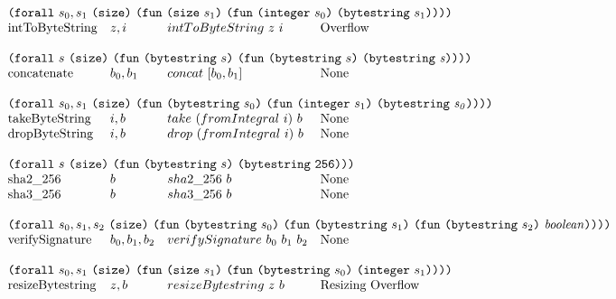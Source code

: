 \documentclass[../main.tex]{subfiles}
\begin{document}
\begin{figure*}[t]
\[\begin{array}{llll}
        \multicolumn{4}{l}{\forallT{s_0,s_1}{\sizeK{}}{\funT{\sizeT{s_1}}{\funT{\integerT{s_0}}{\bytestringT{s_1}}}}}\\
        \mathrm{intToByteString}            &  z, i           &   intToByteString ~ z ~ i   &   \textrm{Overflow} \\
        &&\\
        
        
        \multicolumn{4}{l}{\forallT{s}{\sizeK{}}{\funT{\bytestringT{s}}{\funT{\bytestringT{s}}{\mathit{\bytestringT{s}}}}}}\\
        \mathrm{concatenate}       &   b_0 , b_1   & concat ~ [b_0,b_1]   &   \textrm{None}         \\
        &&\\
        
        \multicolumn{4}{l}{\forallT{s_0,s_1}{\sizeK{}}{\funT{\bytestringT{s_0}}{\funT{\integerT{s_1}}{\mathit{\bytestringT{s_0}}}}}}\\
        \mathrm{takeByteString}    &   i, b     & take ~ (fromIntegral ~ i) ~ b   &   \textrm{None} \\
        \mathrm{dropByteString}    &   i, b     & drop ~ (fromIntegral ~ i) ~ b   &   \textrm{None} \\
        &&\\
        
        \multicolumn{4}{l}{\forallT{s}{\sizeK{}}{\funT{\bytestringT{s}}{\mathit{\bytestringT{\size{256}}}}}}\\
        \mathrm{sha2\_256}         &   b           & sha2\_256 ~ b    & \textrm{None}                \\
        \mathrm{sha3\_256}         &   b           & sha3\_256~ b     & \textrm{None}                \\
        &&\\
        
        \multicolumn{4}{l}{\forallT{s_0,s_1,s_2}{\sizeK{}}{\funT{\bytestringT{s_0}}{\funT{\bytestringT{s_1}}{\funT{\bytestringT{s_2}}{\mathit{\mathit{boolean}}}}}}}\\
        \mathrm{verifySignature}   &   b_0, b_1, b_2           & verifySignature ~ b_0 ~ b_1 ~ b_2   &   \textrm{None}          \\
        &&\\
        
        \multicolumn{4}{l}{\forallT{s_0,s_1}{\sizeK{}}{\funT{\sizeT{s_1}}{\funT{\bytestringT{s_0}}{\integerT{s_1}}}}} \\
        \mathrm{resizeBytestring}   &   z, b   &   resizeBytestring ~ z ~ b   &   \textrm{Resizing Overflow} \\
        &&\\
        

\end{array}\]
\end{figure*}
\end{document}
